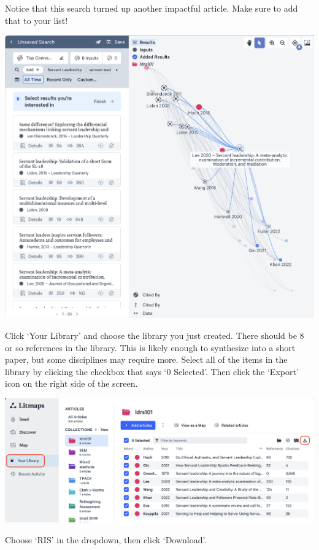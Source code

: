 \documentclass[
]{book}
\theoremstyle{definition}
\theoremstyle{definition}
\theoremstyle{definition}
\theoremstyle{definition}
\theoremstyle{remark}
\begin{document}
Notice that this search turned up another impactful article. Make sure to add that to your list!

\includegraphics{assets/u2/litmaps12.png}

Click `Your Library' and choose the library you just created. There should be 8 or so references in the library. This is likely enough to synthesize into a short paper, but some disciplines may require more. Select all of the items in the library by clicking the checkbox that says `0 Selected'. Then click the `Export' icon on the right side of the screen.

\includegraphics{assets/u2/litmaps13.png}

Choose `RIS' in the dropdown, then click `Download'.
\end{document}
